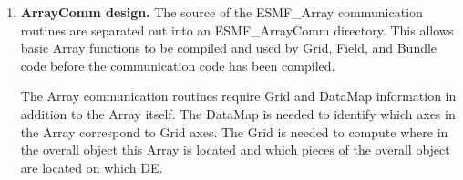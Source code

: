 \begin{enumerate}
\item{\bf ArrayComm design.}
The source of the ESMF\_Array communication routines are separated out into 
an ESMF\_ArrayComm directory.  This allows basic Array functions to be
compiled and used by Grid, Field, and Bundle code before the communication
code has been compiled.  

The Array communication routines require Grid and DataMap information in 
addition to the Array itself.   The DataMap is needed to identify which
axes in the Array correspond to Grid axes.  The Grid is needed to compute
where in the overall object this Array is located and which pieces of
the overall object are located on which DE.


\end{enumerate}





